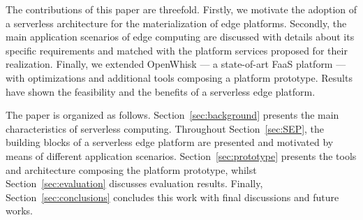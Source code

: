 \documentclass[letterpaper, 10 pt, conference]{ieeeconf}  %
\begin{document}
The contributions of this paper are threefold. Firstly, we motivate the adoption of a serverless architecture for the materialization of edge platforms. Secondly, the main application scenarios of edge computing are discussed with details about its specific requirements and matched with the platform services proposed for their realization. Finally, we extended OpenWhisk --- a state-of-art FaaS platform --- with optimizations and additional tools composing a platform prototype. 
Results have shown the feasibility and the benefits of a serverless edge platform.



The paper is organized as follows. Section~\ref{sec:background} presents the main characteristics of serverless computing.
Throughout Section~\ref{sec:SEP}, the building blocks of a serverless edge platform are presented and motivated by means of different application scenarios. Section~\ref{sec:prototype} presents the tools and architecture composing the platform prototype, whilst Section~\ref{sec:evaluation} discusses evaluation results. Finally, Section~\ref{sec:conclusions} concludes this work with final discussions and future works.





\end{document}
